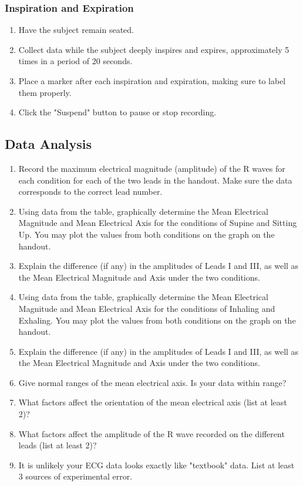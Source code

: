 \documentclass{article}
\begin{document}
\subsubsection*{Inspiration and Expiration}
\begin{enumerate}
	\item Have the subject remain seated.
	\item Collect data while the subject deeply inspires and expires, approximately 5 times in a period of 20 seconds.
	\item Place a marker after each inspiration and expiration, making sure to label them properly.
	\item Click the "Suspend" button to pause or stop recording.
\end{enumerate}

\subsection*{Data Analysis}
\begin{enumerate}
	\item Record the maximum electrical magnitude (amplitude) of the R waves for each condition for each of the two leads in the handout. Make sure the data corresponds to the correct lead number.
	\item Using data from the table, graphically determine the Mean Electrical Magnitude and Mean Electrical Axis for the conditions of Supine and Sitting Up. You may plot the values from both conditions on the graph on the handout.
	\item Explain the difference (if any) in the amplitudes of Leads I and III, as well as the Mean Electrical Magnitude and Axis under the two conditions.
	\item Using data from the table, graphically determine the Mean Electrical Magnitude and Mean Electrical Axis for the conditions of Inhaling and Exhaling. You may plot the values from both conditions on the graph on the handout.
	\item Explain the difference (if any) in the amplitudes of Leads I and III, as well as the Mean Electrical Magnitude and Axis under the two conditions.
	\item Give normal ranges of the mean electrical axis. Is your data within range?
	\item What factors affect the orientation of the mean electrical axis (list at least 2)?
	\item What factors affect the amplitude of the R wave recorded on the different leads (list at least 2)?
	\item It is unlikely your ECG data looks exactly like "textbook" data. List at least 3 sources of experimental error.
\end{enumerate}
\end{document}
